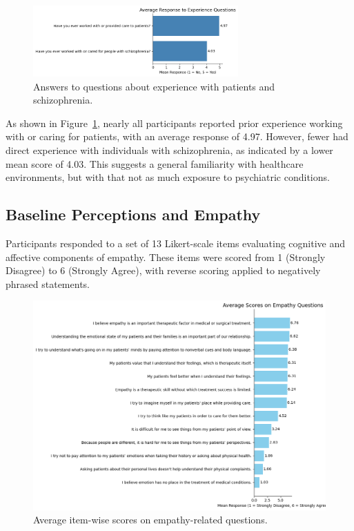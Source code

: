 \begin{figure}[H]
    \centering
    \includegraphics[width=0.7\textwidth]{../../Figures/experience-patients.png}
    \caption{Answers to questions about experience with patients and schizophrenia.}
    \label{fig:experience_patients}
\end{figure}

As shown in Figure~\ref{fig:experience_patients}, nearly all participants reported prior experience working with or caring for patients, with an average response of 4.97. However, fewer had direct experience with individuals with schizophrenia, as indicated by a lower mean score of 4.03. This suggests a general familiarity with healthcare environments, but with that not as much exposure to psychiatric conditions.

\subsection{Baseline Perceptions and Empathy}

Participants responded to a set of 13 Likert-scale items evaluating cognitive and affective components of empathy. These items were scored from 1 (Strongly Disagree) to 6 (Strongly Agree), with reverse scoring applied to negatively phrased statements.

\begin{figure}[H]
    \centering
    \includegraphics[width=\columnwidth]{../../Figures/avg-scores-pre.png}
    \caption{Average item-wise scores on empathy-related questions.}
    \label{fig:avg_scores_pre}
\end{figure}

